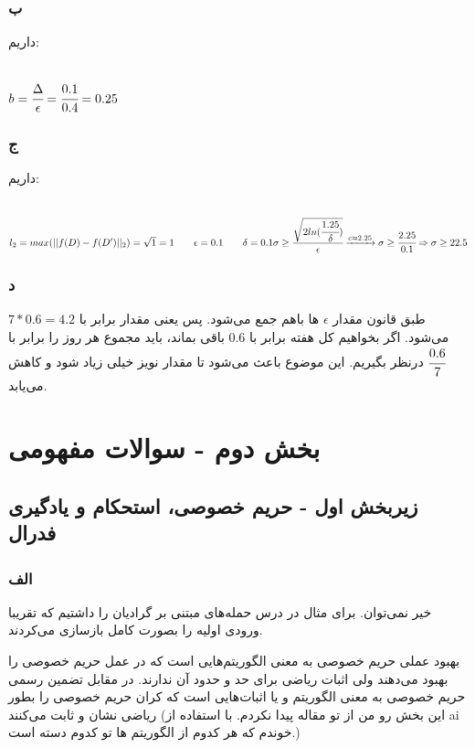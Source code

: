 \subsubsection{ب}
داریم:
\begin{latin}
	~\\
	$
	b = \cfrac{\Delta}{\epsilon} = \cfrac{0.1}{0.4} = 0.25
	$
\end{latin}

\subsubsection{ج}
داریم:
\begin{latin}
	~\\
	$
	l_2 = max(||f(D) - f(D')||_2) = \sqrt{1} = 1  \qquad \epsilon = 0.1 \qquad \delta = 0.1
	\\
	\sigma \geq \cfrac{\sqrt{2ln (\cfrac{1.25}{\delta})}}{\epsilon}  
	\xrightarrow{c \approx 2.25} 
	\sigma \geq \cfrac{2.25}{0.1} 
	\Rightarrow \sigma \geq 22.5
	$
\end{latin}
\subsubsection{د}
طبق قانون 
مقدار 
$\epsilon$
ها باهم جمع می‌شود. پس یعنی مقدار 
برابر با 
$7 * 0.6  = 4.2$
می‌شود. اگر بخواهیم 
کل هفته برابر با 
$0.6$
باقی بماند، باید 
مجموع
هر روز را برابر با 
$\cfrac{0.6}{7}$
درنظر بگیریم. این موضوع باعث می‌شود تا مقدار نویز خیلی زیاد شود و 
کاهش می‌یابد.

\section{بخش دوم - سوالات مفهومی}
\subsection{زیربخش اول - حریم خصوصی، استحکام و یادگیری فدرال}
\subsubsection{الف}
خیر نمی‌توان. برای مثال در درس حمله‌های مبتنی بر گرادیان را داشتیم که تقریبا ورودی اولیه را بصورت کامل بازسازی می‌کردند. 

بهبود عملی حریم خصوصی به معنی الگوریتم‌هایی است که در عمل حریم خصوصی را بهبود می‌دهند ولی اثبات ریاضی برای حد و حدود آن ندارند. در مقابل تضمین رسمی حریم خصوصی به معنی الگوریتم و یا اثبات‌هایی است که کران حریم خصوصی را بطور ریاضی نشان و ثابت می‌کنند (این بخش رو من از تو مقاله پیدا نکردم. با استفاده از ai خوندم که هر کدوم از الگوریتم ها تو کدوم دسته است.)

